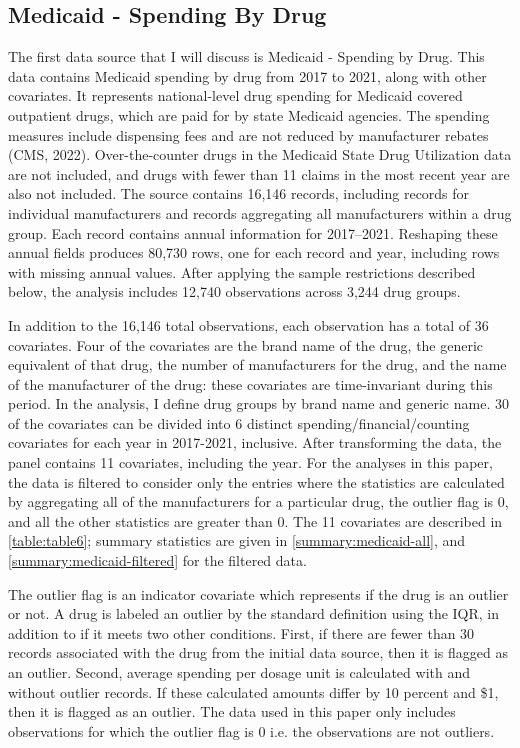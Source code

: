 \documentclass[12pt]{article}
\begin{document}
\subsection{Medicaid - Spending By Drug}
The first data source that I will discuss is Medicaid - Spending by Drug. This data contains Medicaid spending by drug from 2017 to 2021, along with other covariates. It represents national-level drug spending for Medicaid covered outpatient drugs, which are paid for by state Medicaid agencies. The spending measures include dispensing fees and are not reduced by manufacturer rebates (CMS, 2022). Over-the-counter drugs in the Medicaid State Drug Utilization data are not included, and drugs with fewer than 11 claims in the most recent year are also not included. The source contains 16,146 records, including records for individual manufacturers and records aggregating all manufacturers within a drug group. Each record contains annual information for 2017--2021. Reshaping these annual fields produces 80,730 rows, one for each record and year, including rows with missing annual values. After applying the sample restrictions described below, the analysis includes 12,740 observations across 3,244 drug groups.

In addition to the 16,146 total observations, each observation has a total of 36 covariates.
Four of the covariates are the brand name of the drug, the generic equivalent of that drug, the number of manufacturers for the drug, and the name of the manufacturer of the drug: these covariates are time-invariant during this period. In the analysis, I define drug groups by brand name and generic name. 30 of the covariates can be divided into 6 distinct spending/financial/counting covariates for each year in 2017-2021, inclusive. After transforming the data, the panel contains 11 covariates, including the year. For the analyses in this paper, the data is filtered to consider only the entries where the statistics are calculated by aggregating all of the manufacturers for a particular drug, the outlier flag is 0, and all the other statistics are greater than 0. The 11 covariates are described in \autoref{table:table6}; summary statistics are given in \autoref{summary:medicaid-all}, and \autoref{summary:medicaid-filtered} for the filtered data.

The outlier flag is an indicator covariate which represents if the drug is an outlier or not. A drug is labeled an outlier by the standard definition using the IQR, in addition to if it meets two other conditions. First, if there are fewer than 30 records associated with the drug from the initial data source, then it is flagged as an outlier. Second, average spending per dosage unit is calculated with and without outlier records. If these calculated amounts differ by 10 percent and \$1, then it is flagged as an outlier. The data used in this paper only includes observations for which the outlier flag is 0 i.e. the observations are not outliers.
\end{document}
